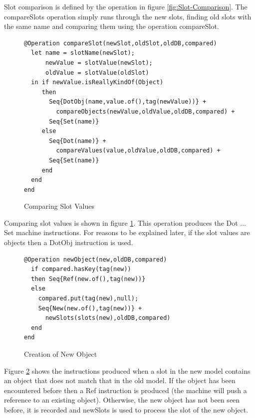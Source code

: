 Slot comparison is defined by the operation in figure \ref{fig:Slot-Comparison}.
The compareSlots operation simply runs through the new slots, finding
old slots with the same name and comparing them using the operation
compareSlot.

%
\begin{figure}
\hfill{}\begin{lstlisting}
@Operation compareSlot(newSlot,oldSlot,oldDB,compared)
  let name = slotName(newSlot);
      newValue = slotValue(newSlot);
      oldValue = slotValue(oldSlot)
  in if newValue.isReallyKindOf(Object)
     then 
       Seq{DotObj(name,value.of(),tag(newValue))} + 
         compareObjects(newValue,oldValue,oldDB,compared) + 
       Seq{Set(name)}
     else 
       Seq{Dot(name)} + 
         compareValues(value,oldValue,oldDB,compared) + 
       Seq{Set(name)}
     end
  end
end
\end{lstlisting}\hfill{}

\caption{Comparing Slot Values\label{fig:Comparing-Slot-Values}}

\end{figure}


Comparing slot values is shown in figure \ref{fig:Comparing-Slot-Values}.
This operation produces the Dot ... Set machine instructions. For
reasons to be explained later, if the slot values are objects then
a DotObj instruction is used.

%
\begin{figure}
\hfill{}\begin{lstlisting}
@Operation newObject(new,oldDB,compared)
  if compared.hasKey(tag(new))
  then Seq{Ref(new.of(),tag(new))}
  else 
    compared.put(tag(new),null);
    Seq{New(new.of(),tag(new))} +
      newSlots(slots(new),oldDB,compared)
  end
end
\end{lstlisting}\hfill{}

\caption{Creation of New Object\label{fig:Creation-of-New}}

\end{figure}


Figure \ref{fig:Creation-of-New} shows the instructions produced
when a slot in the new model contains an object that does not match
that in the old model. If the object has been encountered before then
a Ref instruction is produced (the machine will push a reference to
an existing object). Otherwise, the new object has not been seen before,
it is recorded and newSlots is used to process the slot of the new
object.

